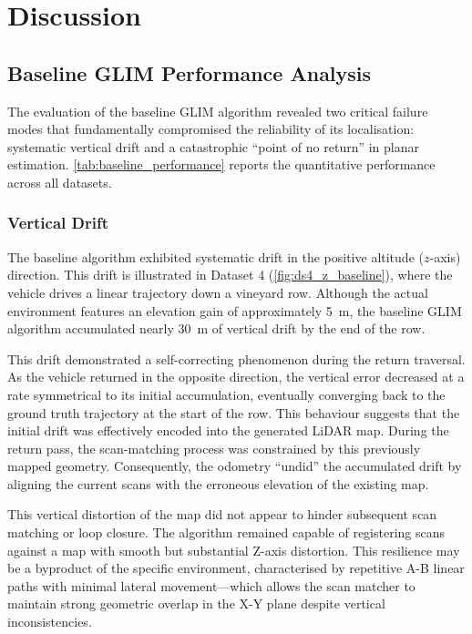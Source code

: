 \section{Discussion}
\label{sec:slam-discussion}


\subsection{Baseline GLIM Performance Analysis}

The evaluation of the baseline GLIM algorithm revealed two critical failure modes that fundamentally compromised the reliability of its localisation: systematic vertical drift and a catastrophic ``point of no return'' in planar estimation. \cref{tab:baseline_performance} reports the quantitative performance across all datasets.

\subsubsection{Vertical Drift}
The baseline algorithm exhibited systematic drift in the positive altitude ($z$-axis) direction. This drift is illustrated in Dataset 4 (\cref{fig:ds4_z_baseline}), where the vehicle drives a linear trajectory down a vineyard row. Although the actual environment features an elevation gain of approximately 5~m, the baseline GLIM algorithm accumulated nearly 30~m of vertical drift by the end of the row.

This drift demonstrated a self-correcting phenomenon during the return traversal. As the vehicle returned in the opposite direction, the vertical error decreased at a rate symmetrical to its initial accumulation, eventually converging back to the ground truth trajectory at the start of the row. This behaviour suggests that the initial drift was effectively encoded into the generated LiDAR map. During the return pass, the scan-matching process was constrained by this previously mapped geometry. Consequently, the odometry ``undid'' the accumulated drift by aligning the current scans with the erroneous elevation of the existing map. 

This vertical distortion of the map did not appear to hinder subsequent scan matching or loop closure. The algorithm remained capable of registering scans against a map with smooth but substantial Z-axis distortion. This resilience may be a byproduct of the specific environment, characterised by repetitive A-B linear paths with minimal lateral movement—which allows the scan matcher to maintain strong geometric overlap in the X-Y plane despite vertical inconsistencies.

